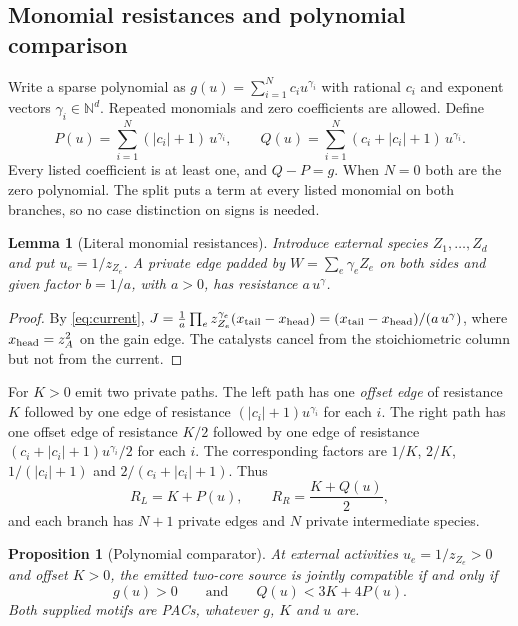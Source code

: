 \documentclass[11pt,a4paper]{article}
\theoremstyle{plain}
\newtheorem{proposition}[theorem]{Proposition}
\newtheorem{lemma}[theorem]{Lemma}
\theoremstyle{definition}
\theoremstyle{remark}
\newcommand{\N}{\mathbb{N}}
\begin{document}
\subsection{Monomial resistances and polynomial comparison}

Write a sparse polynomial as $g(u)=\sum_{i=1}^Nc_iu^{\gamma_i}$ with rational $c_i$ and exponent vectors $\gamma_i\in\N^d$. Repeated monomials and zero coefficients are allowed. Define
\begin{equation}\label{eq:split}
 P(u)=\sum_{i=1}^N(|c_i|+1)\,u^{\gamma_i},\qquad Q(u)=\sum_{i=1}^N(c_i+|c_i|+1)\,u^{\gamma_i}.
\end{equation}
Every listed coefficient is at least one, and $Q-P=g$. When $N=0$ both are the zero polynomial. The split puts a term at every listed monomial on both branches, so no case distinction on signs is needed.

\begin{lemma}[Literal monomial resistances]\label{lem:monomial}
Introduce external species $Z_1,\ldots,Z_d$ and put $u_e=1/z_{Z_e}$. A private edge padded by $W=\sum_e\gamma_eZ_e$ on both sides and given factor $b=1/a$, with $a>0$, has resistance $a\,u^{\gamma}$.
\end{lemma}

\begin{proof}
By \eqref{eq:current}, $J=\frac1a\prod_ez_{Z_e}^{\gamma_e}(x_{\rm tail}-x_{\rm head})=(x_{\rm tail}-x_{\rm head})/(a\,u^\gamma)$, where $x_{\rm head}=z_A^2$ on the gain edge. The catalysts cancel from the stoichiometric column but not from the current.
\end{proof}

For $K>0$ emit two private paths. The left path has one \emph{offset edge} of resistance $K$ followed by one edge of resistance $(|c_i|+1)u^{\gamma_i}$ for each $i$. The right path has one offset edge of resistance $K/2$ followed by one edge of resistance $(c_i+|c_i|+1)u^{\gamma_i}/2$ for each $i$. The corresponding factors are $1/K$, $2/K$, $1/(|c_i|+1)$ and $2/(c_i+|c_i|+1)$. Thus
\begin{equation}\label{eq:comparator}
 R_L=K+P(u),\qquad R_R=\frac{K+Q(u)}{2},
\end{equation}
and each branch has $N+1$ private edges and $N$ private intermediate species.

\begin{proposition}[Polynomial comparator]\label{prop:comparator}
At external activities $u_e=1/z_{Z_e}>0$ and offset $K>0$, the emitted two-core source is jointly compatible if and only if
\begin{equation}\label{eq:comparison}
 g(u)>0\qquad\text{and}\qquad Q(u)<3K+4P(u).
\end{equation}
Both supplied motifs are PACs, whatever $g$, $K$ and $u$ are.
\end{proposition}
\end{document}
